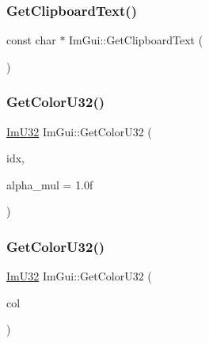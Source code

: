 \subsubsection{\texorpdfstring{Get\+Clipboard\+Text()}{GetClipboardText()}}
{\footnotesize\ttfamily const char $\ast$ Im\+Gui\+::\+Get\+Clipboard\+Text (\begin{DoxyParamCaption}{ }\end{DoxyParamCaption})}

\mbox{\label{namespace_im_gui_a0de2d9bd347d9866511eb8d014e62556}} 
\subsubsection{\texorpdfstring{Get\+Color\+U32()}{GetColorU32()}\hspace{0.1cm}{\footnotesize\ttfamily [1/3]}}
{\footnotesize\ttfamily \mbox{\hyperlink{imgui_8h_a118cff4eeb8d00e7d07ce3d6460eed36}{Im\+U32}} Im\+Gui\+::\+Get\+Color\+U32 (\begin{DoxyParamCaption}\item[{\mbox{\hyperlink{imgui_8h_a1b0467ec582e731ae6292fef726fb5fe}{Im\+Gui\+Col}}}]{idx,  }\item[{float}]{alpha\+\_\+mul = {\ttfamily 1.0f} }\end{DoxyParamCaption})}

\mbox{\label{namespace_im_gui_ac701752365ddd58cecc1956fc62921a8}} 
\subsubsection{\texorpdfstring{Get\+Color\+U32()}{GetColorU32()}\hspace{0.1cm}{\footnotesize\ttfamily [2/3]}}
{\footnotesize\ttfamily \mbox{\hyperlink{imgui_8h_a118cff4eeb8d00e7d07ce3d6460eed36}{Im\+U32}} Im\+Gui\+::\+Get\+Color\+U32 (\begin{DoxyParamCaption}\item[{const \mbox{\hyperlink{struct_im_vec4}{Im\+Vec4}} \&}]{col }\end{DoxyParamCaption})}

\mbox{\label{namespace_im_gui_a834649713437e8fdfa0e5a4fb780d35b}} 
